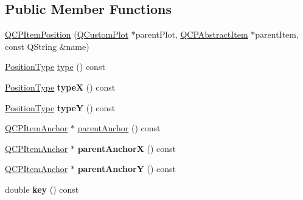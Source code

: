 \subsection*{Public Member Functions}
\begin{DoxyCompactItemize}
\item 
\hyperlink{class_q_c_p_item_position_a6519a552bd9766354644ec24d1f26622}{Q\+C\+P\+Item\+Position} (\hyperlink{class_q_custom_plot}{Q\+Custom\+Plot} $\ast$parent\+Plot, \hyperlink{class_q_c_p_abstract_item}{Q\+C\+P\+Abstract\+Item} $\ast$parent\+Item, const Q\+String \&name)
\item 
\hyperlink{class_q_c_p_item_position_aad9936c22bf43e3d358552f6e86dbdc8}{Position\+Type} \hyperlink{class_q_c_p_item_position_aecb709d72c9aa334a7f62e2c9e0b5d60}{type} () const 
\item 
\hyperlink{class_q_c_p_item_position_aad9936c22bf43e3d358552f6e86dbdc8}{Position\+Type} {\bfseries typeX} () const \hypertarget{class_q_c_p_item_position_a3cb68cf9c95be05c66a0f47448e328e5}{}\label{class_q_c_p_item_position_a3cb68cf9c95be05c66a0f47448e328e5}

\item 
\hyperlink{class_q_c_p_item_position_aad9936c22bf43e3d358552f6e86dbdc8}{Position\+Type} {\bfseries typeY} () const \hypertarget{class_q_c_p_item_position_a8a2fec9dec1ce006a598b32685fd7ab3}{}\label{class_q_c_p_item_position_a8a2fec9dec1ce006a598b32685fd7ab3}

\item 
\hyperlink{class_q_c_p_item_anchor}{Q\+C\+P\+Item\+Anchor} $\ast$ \hyperlink{class_q_c_p_item_position_a7b4ffab9946945c0e11cd2352dc2e042}{parent\+Anchor} () const 
\item 
\hyperlink{class_q_c_p_item_anchor}{Q\+C\+P\+Item\+Anchor} $\ast$ {\bfseries parent\+AnchorX} () const \hypertarget{class_q_c_p_item_position_a485abba71c8552086c5f68e95dca7f9a}{}\label{class_q_c_p_item_position_a485abba71c8552086c5f68e95dca7f9a}

\item 
\hyperlink{class_q_c_p_item_anchor}{Q\+C\+P\+Item\+Anchor} $\ast$ {\bfseries parent\+AnchorY} () const \hypertarget{class_q_c_p_item_position_a1502dba801cb20424b7e097399e372de}{}\label{class_q_c_p_item_position_a1502dba801cb20424b7e097399e372de}

\item 
double {\bfseries key} () const \hypertarget{class_q_c_p_item_position_ac3cb2bddf5f89e5181830be30b93d090}{}\label{class_q_c_p_item_position_ac3cb2bddf5f89e5181830be30b93d090}


\end{DoxyCompactItemize}
